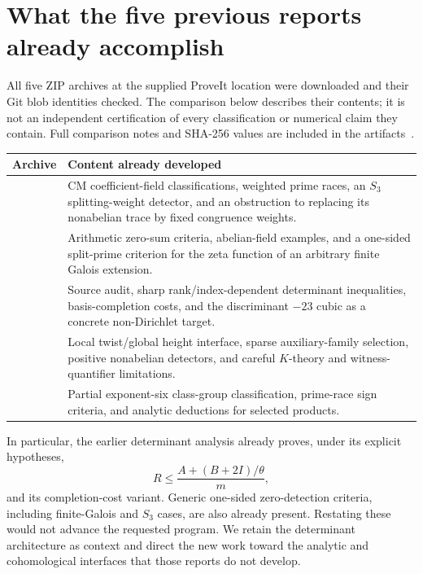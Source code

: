 \documentclass[11pt,letterpaper]{article}
\theoremstyle{remark}
\begin{document}
\section{What the five previous reports already accomplish}
\label{sec:prior}

All five ZIP archives at the supplied ProveIt location were downloaded and
their Git blob identities checked. The comparison below describes their
contents; it is not an independent certification of every classification
or numerical claim they contain. Full comparison notes and SHA-256 values
are included in the artifacts~\cite{incoming}.

\begin{center}
\small
\begin{tabularx}{\textwidth}{p{}Y}
\toprule
Archive & Content already developed\\
\midrule
{} & CM coefficient-field classifications,
weighted prime races, an $S_3$ splitting-weight detector, and an obstruction
to replacing its nonabelian trace by fixed congruence weights.\\
 & Arithmetic zero-sum criteria, abelian-field
examples, and a one-sided split-prime criterion for the zeta function of
an arbitrary finite Galois extension.\\
 & Source audit, sharp rank/index-dependent
determinant inequalities, basis-completion costs, and the discriminant
$-23$ cubic as a concrete non-Dirichlet target.\\
 & Local twist/global height
interface, sparse auxiliary-family selection, positive nonabelian
detectors, and careful $K$-theory and witness-quantifier limitations.\\
 & Partial exponent-six class-group classification,
prime-race sign criteria, and analytic deductions for selected products.\\
\bottomrule
\end{tabularx}
\end{center}

In particular, the earlier determinant analysis already proves, under its
explicit hypotheses,
\[
 R\leq\frac{A+(B+2I)/\theta}{m},
\]
and its completion-cost variant. Generic one-sided zero-detection criteria,
including finite-Galois and $S_3$ cases, are also already present. Restating
these would not advance the requested program. We retain the determinant
architecture as context and direct the new work toward the analytic and
cohomological interfaces that those reports do not develop.
\end{document}
